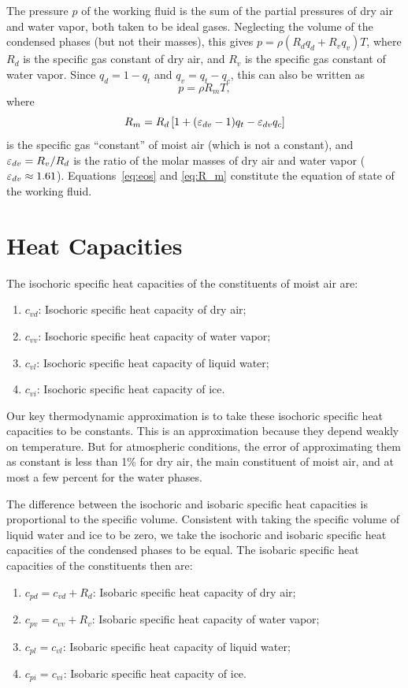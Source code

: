 \documentclass{report}
\begin{document}
The pressure $p$ of the working fluid is the sum of the partial pressures of dry air and water vapor, both taken to be ideal gases. Neglecting the volume of the condensed phases (but not their masses), this gives $p = \rho (R_d q_d + R_v q_v) T$, where $R_d$ is the specific gas constant of dry air, and $R_v$ is the specific gas constant of water vapor. Since $q_d = 1-q_t$ and $q_v = q_t - q_c$, this can also be written as
\begin{equation}
    p = \rho R_m T,
\label{eq:eos}
\end{equation}
where
\begin{equation}
    R_m = R_d \left[1 + (\varepsilon_{dv}-1)q_t - \varepsilon_{dv} q_c\right]
\label{eq:R_m}
\end{equation}
is the specific gas ``constant'' of moist air (which is not a constant), and $\varepsilon_{dv} = R_v/R_d$ is the ratio of the molar masses of dry air and water vapor ($\varepsilon_{dv} \approx 1.61$). Equations~\eqref{eq:eos} and \eqref{eq:R_m} constitute the equation of state of the working fluid.

\section{Heat Capacities}\label{s:heat_capacities}

The isochoric specific heat capacities of the constituents of moist air are:
\begin{enumerate}
    \item $c_{vd}$: Isochoric specific heat capacity of dry air;
    \item $c_{vv}$: Isochoric specific heat capacity of water vapor;
    \item $c_{vl}$: Isochoric specific heat capacity of liquid water;
    \item $c_{vi}$: Isochoric specific heat capacity of ice.
\end{enumerate}
Our key thermodynamic approximation is to take these isochoric specific heat capacities to be constants. This is an approximation because they depend weakly on temperature. But for atmospheric conditions, the error of approximating them as constant is less than 1\% for dry air, the main constituent of moist air, and at most a few percent for the water phases.

The difference between the isochoric and isobaric specific heat capacities is proportional to the specific volume. Consistent with taking the specific volume of liquid water and ice to be zero, we take the isochoric and isobaric specific heat capacities of the condensed phases to be equal. The isobaric specific heat capacities of the constituents then are:
\begin{enumerate}
    \item $c_{pd} = c_{vd} + R_d$: Isobaric specific heat capacity of dry air;
    \item $c_{pv} = c_{vv} + R_v$: Isobaric specific heat capacity of water vapor;
    \item $c_{pl} = c_{vl}$: Isobaric specific heat capacity of liquid water;
    \item $c_{pi} = c_{vi}$: Isobaric specific heat capacity of ice.
\end{enumerate}
\end{document}
